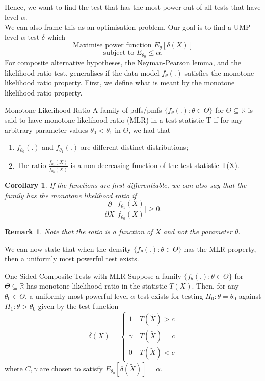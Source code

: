 \documentclass[twoside]{article}
\newtheorem{corollary}[theorem]{Corollary}
\newtheorem{remark}[theorem]{Remark}
\begin{document}
Hence, we want to find the test that has the most power out of all tests that have level $\alpha.$\\

We can also frame this as an optimisation problem. Our goal is to find a UMP level-$\alpha$ test $\delta$ which 
$$
\text{Maximise power function } E_{\theta}[\delta(X)]
$$
$$
\text{subject to } E_{\theta_{0}} \leq \alpha.
$$
\newline
For composite alternative hypotheses, the Neyman-Pearson lemma, and the likelihood ratio test, generalises if the data model $f_{\theta}(.)$ satisfies the monotone-likelihood ratio property. First, we define what is meant by the monotone likelihood ratio property.

\begin{definition_exam}{Monotone Likelihood Ratio}{} A family of pdfs/pmfs $\{f_{\theta}(.): \theta \in \Theta\}$ for $\Theta \subseteq \mathbb{R}$ is said to have monotone likelihood ratio (MLR) in a test statistic T if for any arbitrary parameter values $\theta_0 < \theta_1$ in $\Theta$, we had that 
\begin{enumerate}
\item $f_{\theta_{0}}(.)$ and $f_{\theta_{1}}(.)$ are different distinct distributions;
\item The ratio $\frac{f_{\theta_{1}}(X)}{f_{\theta_{0}}(X)}$ is a non-decreasing function of the test statistic T(X).
\end{enumerate}
\end{definition_exam}

\begin{corollary}If the functions are first-differentiable, we can also say that the family has the monotone likelihood ratio if 
$$
\frac{\partial}{\partial X}\bigg[\frac{f_{\theta_{1}}(X)}{f_{\theta_{0}}(X)} \bigg] \geq 0.
$$
\end{corollary}

\begin{remark}Note that the ratio is a function of X and not the parameter $\theta.$
\end{remark}

We can now state that when the density $\{f_{\theta}(.): \theta \in \Theta\}$ has the MLR property, then a uniformly most powerful test exists.

\begin{theorem_exam}{One-Sided Composite Tests with MLR}{} Suppose a family $\{f_{\theta}(.): \theta \in \Theta\}$ for $\Theta \subseteq \mathbb{R}$ has monotone likelihood ratio in the statistic $T(X).$ Then, for any $\theta_0 \in \Theta$, a uniformly most powerful level-$\alpha$ test exists for testing $H_0: \theta = \theta_0$ against $H_1: \theta > \theta_0$ given by the test function 
$$
\delta(X) = 
\begin{cases}
1 \quad T(\tilde{X}) > c\\
\gamma \quad T(\tilde{X}) = c\\
0 \quad T(\tilde{X}) < c
\end{cases}
$$
where $C, \gamma$ are chosen to satisfy $E_{\theta_{0}}[\delta(\tilde{X})] = \alpha.$
\end{theorem_exam}
\end{document}
